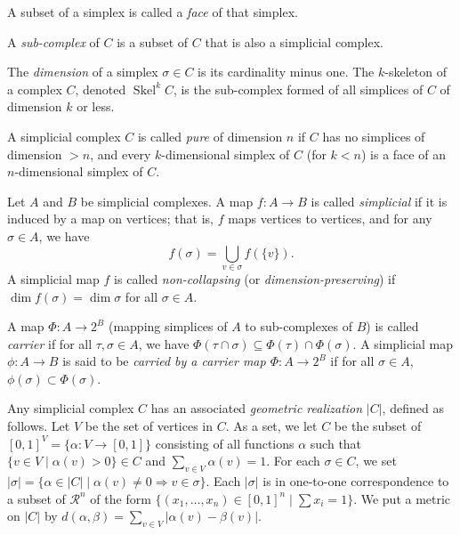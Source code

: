 \documentclass[a4paper]{article}
\def\R{\ensuremath{\mathcal{R}}}
\def\Skel {\operatorname{Skel}}
\begin{document}
A subset of a simplex is called a {\em face} of that simplex.

A {\em sub-complex} of $C$ is a subset of $C$ that is also a simplicial complex.

The {\em dimension} of a simplex $\sigma \in C$ is its cardinality minus one. The $k$-skeleton of a complex $C$,
denoted $\Skel^k C$, is the sub-complex formed of all simplices of $C$ of dimension $k$ or less.

A simplicial complex $C$ is called {\em pure} of dimension $n$ if $C$ has no simplices of dimension $> n$, and
every $k$-dimensional simplex of $C$ (for $k < n$) is a face of an $n$-dimensional simplex of $C$.


Let $A$ and $B$ be simplicial complexes. A map $f: A \to B$ is called {\em simplicial} if it is induced by a map
on vertices; that is, $f$ maps vertices to vertices, and for any $\sigma \in A$, we have $$ f(\sigma) =
\bigcup_{v \in \sigma} f(\{v\}).$$ A simplicial map $f$ is called {\em non-collapsing} (or {\em
dimension-preserving}) if $\dim f(\sigma) = \dim \sigma$ for all
$\sigma \in A$.

A map $\Phi: A \rightarrow 2^B$ (mapping simplices of $A$ to
sub-complexes of $B$) is called \emph{carrier} if for all $\tau,\sigma
\in A$, we have
$\Phi(\tau\cap\sigma)\subseteq\Phi(\tau)\cap\Phi(\sigma)$.
A simplicial map $\phi: A\rightarrow B$ is said to be \emph{carried by
  a carrier map $\Phi:A\to2^B$} if for all $\sigma\in A$,
$\phi(\sigma) \subset \Phi(\sigma)$.



Any simplicial complex $C$ has an associated {\em geometric realization} $|C|$, defined as follows. Let $V$ be
the set of vertices in $C$. As a set, we let $C$ be the subset of $[0,1]^V = \{\alpha : V \to [0,1]\}$
consisting of all functions $\alpha$ such that $\{ v \in V \mid \alpha(v) > 0 \} \in C$ and $\sum_{v \in V}
\alpha(v) = 1$.
For each $\sigma \in C$, we set $|\sigma| = \{ \alpha \in |C| \mid \alpha(v) \neq 0 \Rightarrow v \in \sigma
\}.$ Each $|\sigma|$ is in one-to-one correspondence to a subset of $\R^n$ of the form $\{(x_1, \dots, x_n) \in
[0,1]^n \mid \sum x_i = 1\}.$ We
put a metric on $|C|$ by $d(\alpha, \beta) = \sum_{v \in V} |\alpha(v) - \beta(v)|.$ 
\end{document}
